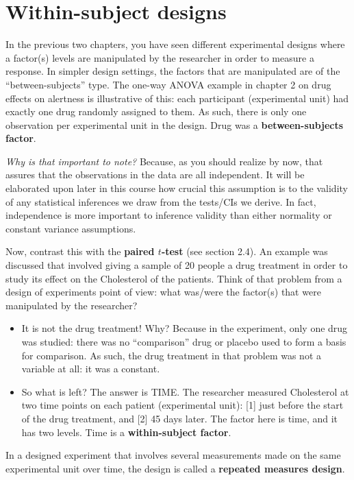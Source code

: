 \documentclass[
]{book}
\providecommand{\tightlist}{%
  \setlength{\itemsep}{0pt}\setlength{\parskip}{0pt}}
\begin{document}
\hypertarget{within-subject-designs}{%
\section{Within-subject designs}\label{within-subject-designs}}

In the previous two chapters, you have seen different experimental designs where a factor(s) levels are manipulated by the researcher in order to measure a response.
In simpler design settings, the factors that are manipulated are of the ``between-subjects'' type.
The one-way ANOVA example in chapter 2 on drug effects on alertness is illustrative of this: each participant (experimental unit) had exactly one drug randomly assigned to them.
As such, there is only one observation per experimental unit in the design.
Drug was a \textbf{between-subjects factor}.

\emph{Why is that important to note?}
Because, as you should realize by now, that assures that the observations in the data are all independent.
It will be elaborated upon later in this course how crucial this assumption is to the validity of any statistical inferences we draw from the tests/CIs we derive.
In fact, independence is more important to inference validity than either normality or constant variance assumptions.

Now, contrast this with the \textbf{paired \(t\)-test} (see section 2.4).
An example was discussed that involved giving a sample of 20 people a drug treatment in order to study its effect on the Cholesterol of the patients.
Think of that problem from a design of experiments point of view: what was/were the factor(s) that were manipulated by the researcher?

\begin{itemize}
\tightlist
\item
  It is not the drug treatment! Why? Because in the experiment, only one drug was studied: there was no ``comparison'' drug or placebo used to form a basis for comparison. As such, the drug treatment in that problem was not a variable at all: it was a constant.
\item
  So what is left? The answer is TIME. The researcher measured Cholesterol at two time points on each patient (experimental unit): {[}1{]} just before the start of the drug treatment, and {[}2{]} 45 days later. The factor here is time, and it has two levels. Time is a \textbf{within-subject factor}.
\end{itemize}

In a designed experiment that involves several measurements made on the same experimental unit over time, the design is called a \textbf{repeated measures design}.
\end{document}
